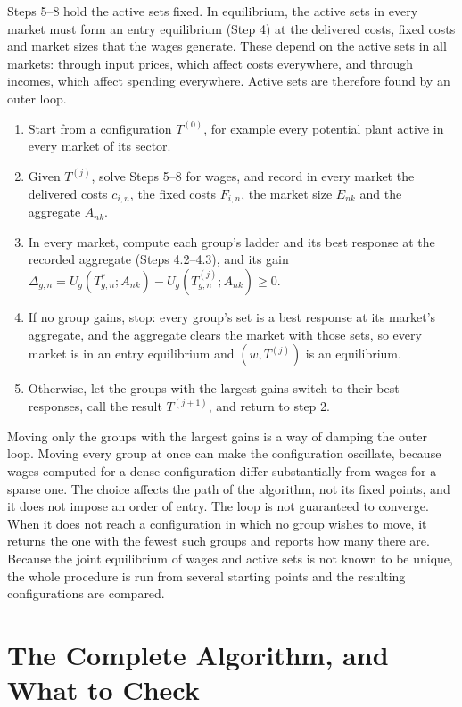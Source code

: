 \documentclass[11pt]{article}
\theoremstyle{remark}
\begin{document}
Steps 5--8 hold the active sets fixed. In equilibrium, the active sets in every market
must form an entry equilibrium (Step 4) at the delivered costs, fixed costs and market
sizes that the wages generate. These depend on the active sets in all markets: through
input prices, which affect costs everywhere, and through incomes, which affect spending
everywhere. Active sets are therefore found by an outer loop.

\begin{enumerate}
\item Start from a configuration $T^{(0)}$, for example every potential plant active
in every market of its sector.
\item Given $T^{(j)}$, solve Steps 5--8 for wages, and record in every market the
delivered costs $c_{i,n}$, the fixed costs $F_{i,n}$, the market size $E_{nk}$ and the
aggregate $A_{nk}$.
\item In every market, compute each group's ladder and its best response at the
recorded aggregate (Steps 4.2--4.3), and its gain
$\Delta_{g,n}=U_g(T^*_{g,n};A_{nk})-U_g(T^{(j)}_{g,n};A_{nk})\ge0$.
\item If no group gains, stop: every group's set is a best response at its market's
aggregate, and the aggregate clears the market with those sets, so every market is in
an entry equilibrium and $(w,T^{(j)})$ is an equilibrium.
\item Otherwise, let the groups with the largest gains switch to their best responses,
call the result $T^{(j+1)}$, and return to step 2.
\end{enumerate}

\noindent Moving only the groups with the largest gains is a way of damping the outer
loop. Moving every group at once can make the configuration oscillate, because wages
computed for a dense configuration differ substantially from wages for a sparse one.
The choice affects the path of the algorithm, not its fixed points, and it does not
impose an order of entry. The loop is not guaranteed to converge. When it does not
reach a configuration in which no group wishes to move, it returns the one with the
fewest such groups and reports how many there are. Because the joint equilibrium of
wages and active sets is not known to be unique, the whole procedure is run from
several starting points and the resulting configurations are compared.

\section{The Complete Algorithm, and What to Check}
\label{sec:summary}
\end{document}
